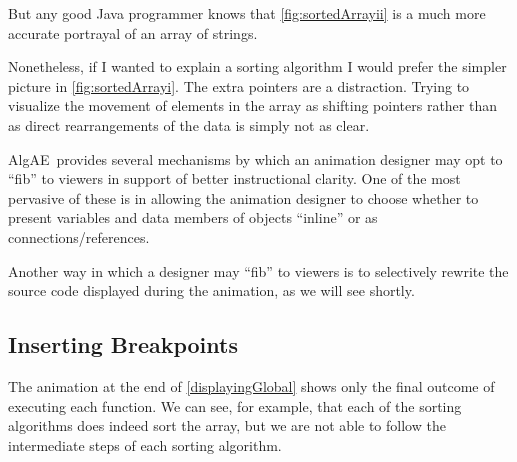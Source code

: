 \documentclass[11pt,titlepage]{book}
\newcommand{\algae}{{\sc AlgAE}}
\begin{document}
But any good Java programmer knows that \autoref{fig:sortedArrayii} is
a much more accurate portrayal of an array of strings.

Nonetheless, if I wanted to explain a sorting algorithm I would prefer
the simpler picture in \autoref{fig:sortedArrayi}. The extra pointers
are a distraction. Trying to visualize the movement of elements in the
array as shifting pointers rather than as direct rearrangements of the
data is simply not as clear.

\algae\ provides several mechanisms by which an animation designer may
opt to ``fib'' to viewers in support of better instructional
clarity. One of the most pervasive of these is in allowing the
animation designer to choose whether to present variables and data
members of objects ``inline'' or as connections/references.

Another way in which a designer may ``fib'' to viewers is to
selectively rewrite the source code displayed during the animation, as
we will see shortly.

\subsection{Inserting Breakpoints}

The animation at the end of \autoref{displayingGlobal} shows only the
final outcome of executing each function. We can see, for example,
that each of the sorting algorithms does indeed sort the array, but we
are not able to follow the intermediate steps of each sorting
algorithm.
\end{document}
